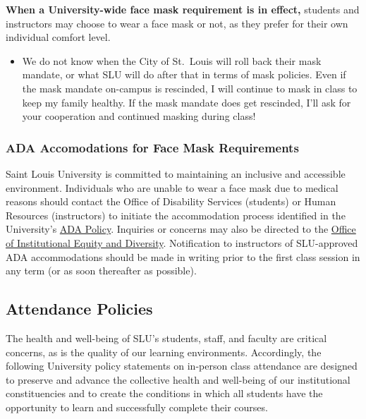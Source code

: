 \documentclass[
]{book}
\newenvironment{rmdblock}[1]
  {\begin{shaded*}
  \begin{itemize}
  \renewcommand{\labelitemi}{
    \raisebox{-.7\height}[0pt][0pt]{
      {\setkeys{Gin}{width=3em,keepaspectratio}\texttt{[image: images/\#1]}}
    }
  }
  \item
  }
  {
  \end{itemize}
  \end{shaded*}
  }
\newenvironment{rmdwarning}
  {\begin{rmdblock}{warning}}
  {\end{rmdblock}}
\begin{document}
\textbf{When a University-wide face mask requirement is in effect,} students and instructors may choose to wear a face mask or not, as they prefer for their own individual comfort level.

\begin{rmdwarning}
We do not know when the City of St.~Louis will roll back their mask
mandate, or what SLU will do after that in terms of mask policies. Even
if the mask mandate on-campus is rescinded, I will continue to mask in
class to keep my family healthy. If the mask mandate does get rescinded,
I'll ask for your cooperation and continued masking during class!
\end{rmdwarning}

\hypertarget{ada-accomodations-for-face-mask-requirements}{%
\subsubsection{ADA Accomodations for Face Mask Requirements}\label{ada-accomodations-for-face-mask-requirements}}

Saint Louis University is committed to maintaining an inclusive and accessible environment. Individuals who are unable to wear a face mask due to medical reasons should contact the Office of Disability Services (students) or Human Resources (instructors) to initiate the accommodation process identified in the University's \href{https://www.slu.edu/human-resources/pdfs/policies/americans-disabilities-act-policy.pdf}{ADA Policy}. Inquiries or concerns may also be directed to the \href{https://www.slu.edu/general-counsel/institutional-equity-diversity/index.php}{Office of Institutional Equity and Diversity}. Notification to instructors of SLU-approved ADA accommodations should be made in writing prior to the first class session in any term (or as soon thereafter as possible).

\hypertarget{attendance-policies}{%
\subsection{Attendance Policies}\label{attendance-policies}}

The health and well-being of SLU's students, staff, and faculty are critical concerns, as is the quality of our learning environments. Accordingly, the following University policy statements on in-person class attendance are designed to preserve and advance the collective health and well-being of our institutional constituencies and to create the conditions in which all students have the opportunity to learn and successfully complete their courses.
\end{document}

